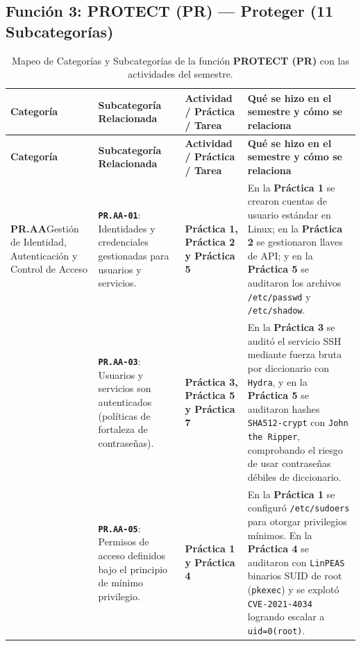 \documentclass[letterpaper,11pt]{article}
\begin{document}
\subsection{Función 3: PROTECT (PR) --- Proteger (11 Subcategorías)}

\begingroup
\scriptsize
\setlength{\tabcolsep}{4pt}
\renewcommand{\arraystretch}{1.24}
\begin{longtable}{|L{2.8cm}|L{4.5cm}|L{2.9cm}|L{6.5cm}|}
\caption{Mapeo de Categorías y Subcategorías de la función \textbf{PROTECT (PR)} con las actividades del semestre.}
\label{tab:mapeo-pr} \\
\hline
{}
\textbf{Categoría} & \textbf{Subcategoría Relacionada} & \textbf{Actividad / Práctica / Tarea} & \textbf{Qué se hizo en el semestre y cómo se relaciona} \\
\hline
\endfirsthead
\hline
{}
\textbf{Categoría} & \textbf{Subcategoría Relacionada} & \textbf{Actividad / Práctica / Tarea} & \textbf{Qué se hizo en el semestre y cómo se relaciona} \\
\hline
\endhead
\hline
\endfoot

\textbf{PR.AA}\newline Gestión de Identidad, Autenticación y Control de Acceso &
\textbf{\texttt{PR.AA-01}}: Identidades y credenciales gestionadas para usuarios y servicios. &
\textbf{Práctica 1, Práctica 2 y Práctica 5} &
En la \textbf{Práctica 1} se crearon cuentas de usuario estándar en Linux; en la \textbf{Práctica 2} se gestionaron llaves de API; y en la \textbf{Práctica 5} se auditaron los archivos \texttt{/etc/passwd} y \texttt{/etc/shadow}. \\
\nopagebreak
 &
\textbf{\texttt{PR.AA-03}}: Usuarios y servicios son autenticados (políticas de fortaleza de contraseñas). &
\textbf{Práctica 3, Práctica 5 y Práctica 7} &
En la \textbf{Práctica 3} se auditó el servicio SSH mediante fuerza bruta por diccionario con \texttt{Hydra}, y en la \textbf{Práctica 5} se auditaron hashes \texttt{SHA512-crypt} con \texttt{John the Ripper}, comprobando el riesgo de usar contraseñas débiles de diccionario. \\
\nopagebreak
 &
\textbf{\texttt{PR.AA-05}}: Permisos de acceso definidos bajo el principio de mínimo privilegio. &
\textbf{Práctica 1 y Práctica 4} &
En la \textbf{Práctica 1} se configuró \texttt{/etc/sudoers} para otorgar privilegios mínimos. En la \textbf{Práctica 4} se auditaron con \texttt{LinPEAS} binarios SUID de root (\texttt{pkexec}) y se explotó \texttt{CVE-2021-4034} logrando escalar a \texttt{uid=0(root)}. \\
\hline


\end{longtable}
\end{document}

